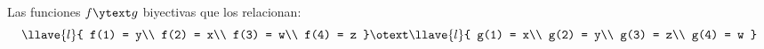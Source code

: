 \begin{enumerate}[label=\tiny\purple{\faIcon{calculator}}]
\begin{minipage}{0.3\textwidth}
          Las funciones $f\ytext g$ biyectivas que los relacionan:
          $$
            \llave{l}{
              f(1) = y\\
              f(2) = x\\
              f(3) = w\\
              f(4) = z
            }
            \otext
            \llave{l}{
              g(1) = x\\
              g(2) = y\\
              g(3) = z\\
              g(4) = w
            }
          $$
        \end{minipage}

\end{enumerate}
